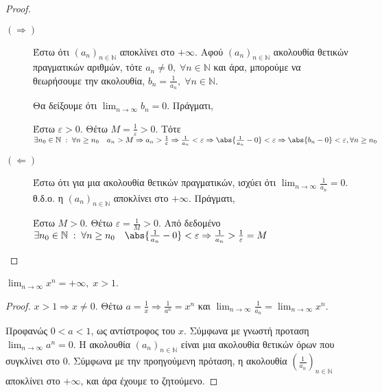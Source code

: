 \documentclass[main.tex]{subfiles}
\begin{document}
\begin{proof}
\item {}
    \begin{description}
        \item[$ (\Rightarrow) $] Έστω ότι $ (a_{n})_{n \in \mathbb{N}} $ 
            αποκλίνει στο $ + \infty $. Αφού $ (a_{n})_{n \in \mathbb{N}} $
            ακολουθία θετικών πραγματικών αριθμών, τότε $ a_{n} \neq 0, 
            \; \forall n \in \mathbb{N}$ και άρα, μπορούμε να θεωρήσουμε 
            την ακολουθία, $ b_{n} = \frac{1}{a_{n}}, \; \forall n \in
            \mathbb{N}  $. 

            Θα δείξουμε ότι $ \lim_{n \to \infty} b_{n} = 0 $. Πράγματι,

            Έστω $ \varepsilon >0 $. Θέτω $ M = \frac{1}{\varepsilon} >0 $.
            Τότε $ \exists n_{0} \in \mathbb{N} \; : \; \forall n \geq 
            n_{0} \quad a_{n}> M \Rightarrow a_{n} > \frac{1}{\varepsilon} 
            \Rightarrow \frac{1}{a_{n}} < \varepsilon \Rightarrow
            \abs{\frac{1}{a_{n}} - 0} < \varepsilon \Rightarrow 
            \abs{b_{n}-0} < \varepsilon, \forall n \geq n_{0} $

        \item [$ ( \Leftarrow) $]
            Έστω ότι για μια ακολουθία θετικών πραγματικών, ισχύει ότι 
            $ \lim_{n \to \infty} \frac{1}{a_{n}} = 0$. θ.δ.ο. η $ 
            (a_{n})_{n \in \mathbb{N}}$ αποκλίνει στο $ + \infty $. Πράγματι,

            Έστω $ M > 0 $. Θέτω $ \varepsilon = \frac{1}{M} > 0 $. Από 
            δεδομένο $ \exists n_{0} \in \mathbb{N} \; : \; \forall n \geq 
            n_{0} \quad \abs{\frac{1}{a_{n}} - 0} < \varepsilon \Rightarrow
            \frac{1}{a_{n}} > \frac{1}{\varepsilon}=M $
    \end{description}
\end{proof}

\begin{prop}
    $ \lim_{n \to \infty} x^{n} = +\infty, \; x >1 $.
\end{prop}

\begin{proof}
\item {}
    $ x >1 \Rightarrow x \neq 0 $. Θέτω  $a = \frac{1}{x} \Rightarrow 
    \frac{1}{a^{n}} = x^{n} $ και $ \lim_{n \to \infty} \frac{1}{a_{n}} = 
    \lim_{n \to \infty}x^{n}$.

    Προφανώς $ 0 < a <1 $, ως αντίστροφος του $x$. Σύμφωνα με γνωστή προταση
    $ \lim_{n \to \infty} a^{n} = 0 $. Η ακολουθία $ (a_{n})_{n \in \mathbb{N}}
    $ είναι μια ακολουθία θετικών όρων που συγκλίνει στο 0. Σύμφωνα με 
    την προηγούμενη πρόταση, η ακολουθία $ \left(\frac{1}{a_{n}}\right)_{n 
    \in \mathbb{N}} $ αποκλίνει στο $ + \infty $, και άρα έχουμε το ζητούμενο.
\end{proof}
\end{document}
